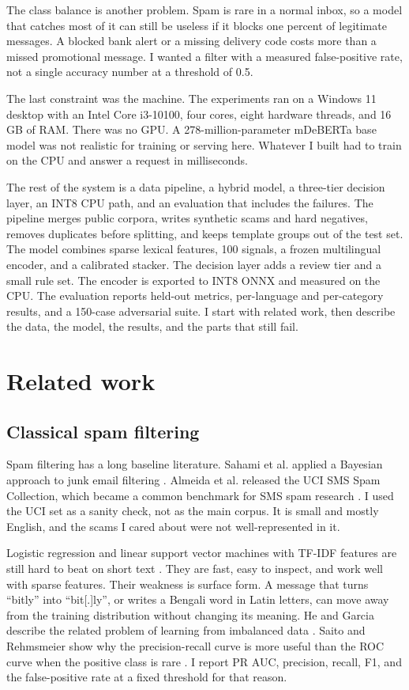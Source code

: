 \documentclass[11pt]{article}
\begin{document}
The class balance is another problem. Spam is rare in a normal inbox, so a model that catches most of it can still be useless if it blocks one percent of legitimate messages. A blocked bank alert or a missing delivery code costs more than a missed promotional message. I wanted a filter with a measured false-positive rate, not a single accuracy number at a threshold of 0.5.

The last constraint was the machine. The experiments ran on a Windows 11 desktop with an Intel Core i3-10100, four cores, eight hardware threads, and 16 GB of RAM. There was no GPU. A 278-million-parameter mDeBERTa base model was not realistic for training or serving here. Whatever I built had to train on the CPU and answer a request in milliseconds.

The rest of the system is a data pipeline, a hybrid model, a three-tier decision layer, an INT8 CPU path, and an evaluation that includes the failures. The pipeline merges public corpora, writes synthetic scams and hard negatives, removes duplicates before splitting, and keeps template groups out of the test set. The model combines sparse lexical features, 100 signals, a frozen multilingual encoder, and a calibrated stacker. The decision layer adds a review tier and a small rule set. The encoder is exported to INT8 ONNX and measured on the CPU. The evaluation reports held-out metrics, per-language and per-category results, and a 150-case adversarial suite. I start with related work, then describe the data, the model, the results, and the parts that still fail.

\section{Related work}

\subsection{Classical spam filtering}

Spam filtering has a long baseline literature. Sahami et al. applied a Bayesian approach to junk email filtering \cite{sahami1998}. Almeida et al. released the UCI SMS Spam Collection, which became a common benchmark for SMS spam research \cite{almeida2011}. I used the UCI set as a sanity check, not as the main corpus. It is small and mostly English, and the scams I cared about were not well-represented in it.

Logistic regression and linear support vector machines with TF-IDF features are still hard to beat on short text \cite{pedregosa2011}. They are fast, easy to inspect, and work well with sparse features. Their weakness is surface form. A message that turns ``bitly'' into ``bit[.]ly'', or writes a Bengali word in Latin letters, can move away from the training distribution without changing its meaning. He and Garcia describe the related problem of learning from imbalanced data \cite{he2009}. Saito and Rehmsmeier show why the precision-recall curve is more useful than the ROC curve when the positive class is rare \cite{saito2015}. I report PR AUC, precision, recall, F1, and the false-positive rate at a fixed threshold for that reason.
\end{document}
